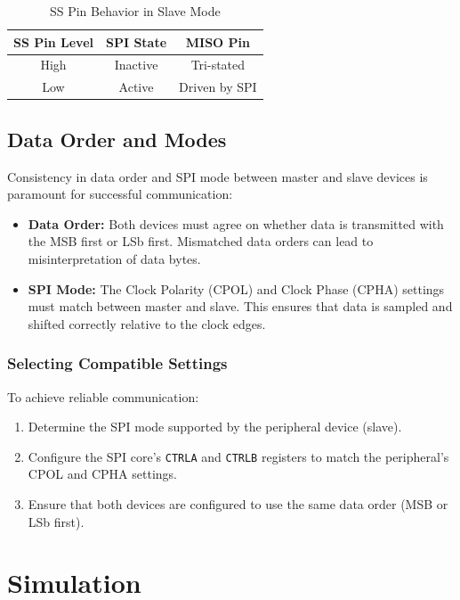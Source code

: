 \documentclass{article}
\begin{document}
\begin{table}[H]
    \centering
    \caption{SS Pin Behavior in Slave Mode}
    \begin{tabular}{@{}ccc@{}}
        \toprule
        \textbf{SS Pin Level} & \textbf{SPI State} & \textbf{MISO Pin} \\ \midrule
        High & Inactive & Tri-stated \\
        Low & Active & Driven by SPI \\ \bottomrule
    \end{tabular}
    \label{tab:ss_behavior}
\end{table}

\subsection{Data Order and Modes}
Consistency in data order and SPI mode between master and slave devices is paramount for successful communication:

\begin{itemize}
    \item \textbf{Data Order:} Both devices must agree on whether data is transmitted with the MSB first or LSb first. Mismatched data orders can lead to misinterpretation of data bytes.
    \item \textbf{SPI Mode:} The Clock Polarity (CPOL) and Clock Phase (CPHA) settings must match between master and slave. This ensures that data is sampled and shifted correctly relative to the clock edges.
\end{itemize}

\subsubsection{Selecting Compatible Settings}
To achieve reliable communication:
\begin{enumerate}
    \item Determine the SPI mode supported by the peripheral device (slave).
    \item Configure the SPI core's \texttt{CTRLA} and \texttt{CTRLB} registers to match the peripheral's CPOL and CPHA settings.
    \item Ensure that both devices are configured to use the same data order (MSB or LSb first).
\end{enumerate}

\section{Simulation}
\end{document}
